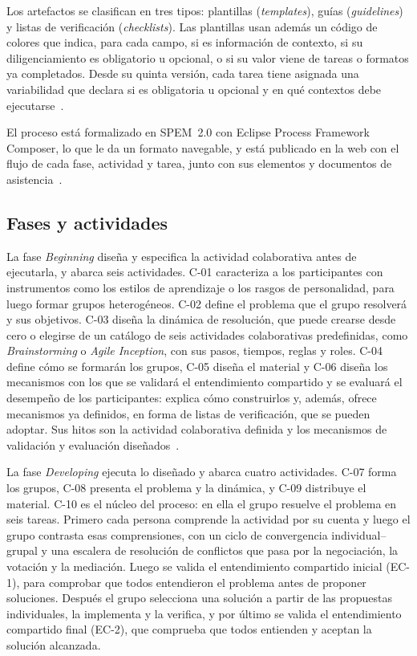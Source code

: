 \documentclass[12pt,letterpaper,oneside]{report}
\begin{document}
Los artefactos se clasifican en tres tipos: plantillas
(\textit{templates}), guías (\textit{guidelines}) y listas de verificación
(\textit{checklists}). Las plantillas usan además un código de colores que
indica, para cada campo, si es información de contexto, si su diligenciamiento
es obligatorio u opcional, o si su valor viene de tareas o formatos ya
completados. Desde su quinta versión, cada tarea tiene asignada una
variabilidad que declara si es obligatoria u opcional y en qué contextos debe
ejecutarse~\cite{agredo2022thesis}.

El proceso está formalizado en SPEM~2.0 con Eclipse Process Framework Composer,
lo que le da un formato navegable, y está publicado en la web con el flujo de
cada fase, actividad y tarea, junto con sus elementos y documentos de
asistencia~\cite{agredo2022thesis}.


\subsection{Fases y actividades}
\label{sec:base_fases}
La fase \textit{Beginning} diseña y especifica la actividad colaborativa antes
de ejecutarla, y abarca seis actividades. C-01 caracteriza a los participantes
con instrumentos como los estilos de aprendizaje o los rasgos de personalidad,
para luego formar grupos heterogéneos. C-02 define el problema que el grupo
resolverá y sus objetivos. C-03 diseña la dinámica de resolución, que puede
crearse desde cero o elegirse de un catálogo de seis actividades colaborativas
predefinidas, como \textit{Brainstorming} o \textit{Agile Inception}, con sus
pasos, tiempos, reglas y roles. C-04 define cómo se formarán los grupos, C-05
diseña el material y C-06 diseña los mecanismos con los que se validará el
entendimiento compartido y se evaluará el desempeño de los participantes:
explica cómo construirlos y, además, ofrece mecanismos ya definidos, en forma de
listas de verificación, que se pueden adoptar. Sus hitos son la
actividad colaborativa definida y los mecanismos de validación y evaluación
diseñados~\cite{agredo2022thesis}.

La fase \textit{Developing} ejecuta lo diseñado y abarca cuatro actividades.
C-07 forma los grupos, C-08 presenta el problema y la dinámica, y C-09 distribuye
el material. C-10 es el núcleo del proceso: en ella el grupo resuelve el problema en seis tareas. Primero cada persona comprende la actividad por su
cuenta y luego el grupo contrasta esas comprensiones, con un ciclo de
convergencia individual--grupal y una escalera de resolución de conflictos que
pasa por la negociación, la votación y la mediación. Luego se valida el
entendimiento compartido inicial (EC-1), para comprobar que todos entendieron
el problema antes de proponer soluciones. Después el grupo selecciona una
solución a partir de las propuestas individuales, la implementa y la verifica,
y por último se valida el entendimiento compartido final (EC-2), que comprueba
que todos entienden y aceptan la solución alcanzada.
\end{document}
